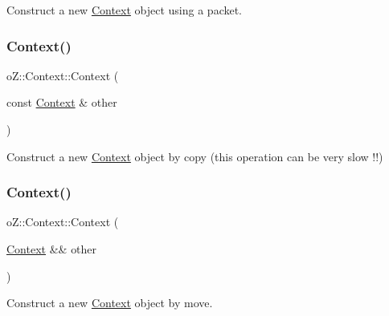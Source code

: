Construct a new \mbox{\hyperlink{classo_z_1_1_context}{Context}} object using a packet. 

\mbox{\label{classo_z_1_1_context_a906eb29f22e89bc121c47096c7a4b601}} 
\subsubsection{\texorpdfstring{Context()}{Context()}\hspace{0.1cm}{\footnotesize\ttfamily [3/4]}}
{\footnotesize\ttfamily o\+Z\+::\+Context\+::\+Context (\begin{DoxyParamCaption}\item[{const \mbox{\hyperlink{classo_z_1_1_context}{Context}} \&}]{other }\end{DoxyParamCaption})\hspace{0.3cm}{\ttfamily [default]}}



Construct a new \mbox{\hyperlink{classo_z_1_1_context}{Context}} object by copy (this operation can be very slow !!) 

\mbox{\label{classo_z_1_1_context_ad4a49704266f6e8312b1c9c2ca8ad710}} 
\subsubsection{\texorpdfstring{Context()}{Context()}\hspace{0.1cm}{\footnotesize\ttfamily [4/4]}}
{\footnotesize\ttfamily o\+Z\+::\+Context\+::\+Context (\begin{DoxyParamCaption}\item[{\mbox{\hyperlink{classo_z_1_1_context}{Context}} \&\&}]{other }\end{DoxyParamCaption})\hspace{0.3cm}{\ttfamily [default]}}



Construct a new \mbox{\hyperlink{classo_z_1_1_context}{Context}} object by move. 

\mbox{\label{classo_z_1_1_context_afe2e01a552a7711772e4028f778703e8}} 
